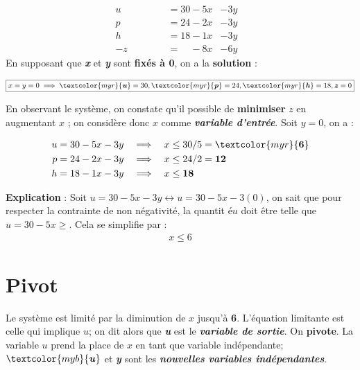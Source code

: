 \documentclass{report}
\begin{document}
\begin{multicols*}{2}
\begin{alignat*}{3}
    u \quad\quad\quad\quad &= 30 - 5x& -3y & \\
    p \quad\quad\quad &= 24 -2x& -3y & \\
    h \quad\quad &= 18 -1x& -3y & \\
    -z \quad &= \phantom{18} -8x& -6y &
\end{alignat*}
En supposant que 
\textcolor{myb}{\textbf{\textit{x}}} et 
\textcolor{myb}{\textbf{\textit{y}}}  sont \textbf{fixés à 0}, 
on a la \textbf{solution} : 

\begin{align*}
\boxed{x = y = 0 \implies 
\textcolor{myr}{\textbf{\textit{u}}}  = 30, 
\textcolor{myr}{\textbf{\textit{p}}} = 24,
\textcolor{myr}{\textbf{\textit{h}}} = 18,
\textbf{\textit{z}} = 0}
\end{align*}

En observant le système, on constate qu'il possible de 
\textbf{minimiser} $z$ en augmentant $x$ ; on considère 
donc $x$ comme \textcolor{myb}{\textbf{\textit{variable d'entrée}}}. Soit 
$y = 0$, on a :

\begin{align*}
    u &= 30 - 5x -3y& 
    \implies \quad 
    & x \leq 30/5 = \textcolor{myr}{\textbf{6}}  
    \\
    p &= 24 -2x -3y 
    & \implies \quad  &  x \leq 24/2 = \textbf{12}  
    \\
    h &= 18 - 1x -3y&
    \implies \quad & x \leq \textbf{18}  
\end{align*}

\textbf{Explication} : Soit $u = 30 - 5x -3y \leftrightarrow u = 30 - 5x -3(0)$, 
on sait que pour respecter 
la contrainte de non négativité, la quantit é$u$ 
doit être telle que $u = 30 -5x \geq$. Cela se simplifie par :
\begin{align*}
    \boxed{x \leq 6}
\end{align*}
\vspace{-4em}
\section{Pivot}
Le système est limité par la diminution de $x$ jusqu'à \textcolor{myr}{\textbf{6}}.
L'équation limitante est celle qui implique $u$; on dit alors que 
\textcolor{myr}{\textbf{\textit{u}}} est le 
\textcolor{myr}{\textbf{\textit{variable de sortie}}}. On 
\textbf{pivote}. La variable $u$ prend la place de $x$ en tant que
variable indépendante;
$\textcolor{myb}{\textbf{\textit{u}}}$ et  
\textcolor{myb}{\textbf{\textit{y}}} sont les 
\textcolor{myb}{\textbf{\textit{nouvelles variables indépendantes}}}.   


\end{multicols*}
\end{document}
